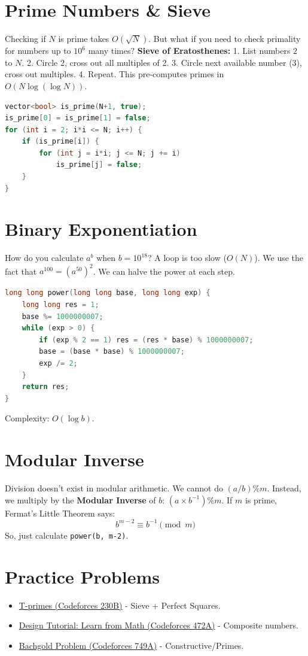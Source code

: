 \documentclass[12pt, a4paper]{report}
\begin{document}
\section{Prime Numbers & Sieve}
Checking if $N$ is prime takes $O(\sqrt{N})$.
But what if you need to check primality for numbers up to $10^6$ many times?
\textbf{Sieve of Eratosthenes:}
1. List numbers $2$ to $N$.
2. Circle 2, cross out all multiples of 2.
3. Circle next available number (3), cross out multiples.
4. Repeat.
This pre-computes primes in $O(N \log (\log N))$.

\begin{lstlisting}[language=C++]
vector<bool> is_prime(N+1, true);
is_prime[0] = is_prime[1] = false;
for (int i = 2; i*i <= N; i++) {
    if (is_prime[i]) {
        for (int j = i*i; j <= N; j += i)
            is_prime[j] = false;
    }
}
\end{lstlisting}

\section{Binary Exponentiation}
How do you calculate $a^b$ when $b = 10^{18}$? A loop is too slow ($O(N)$).
We use the fact that $a^{100} = (a^{50})^2$. We can halve the power at each step.
\begin{lstlisting}[language=C++]
long long power(long long base, long long exp) {
    long long res = 1;
    base %= 1000000007;
    while (exp > 0) {
        if (exp % 2 == 1) res = (res * base) % 1000000007;
        base = (base * base) % 1000000007;
        exp /= 2;
    }
    return res;
}
\end{lstlisting}
Complexity: $O(\log b)$.

\section{Modular Inverse}
Division doesn't exist in modular arithmetic. We cannot do $(a / b) \% m$.
Instead, we multiply by the \textbf{Modular Inverse} of $b$: $(a \times b^{-1}) \% m$.
If $m$ is prime, Fermat's Little Theorem says:
\[ b^{m-2} \equiv b^{-1} \pmod m \]
So, just calculate \texttt{power(b, m-2)}.

\section{Practice Problems}
\begin{itemize}
    \item \href{https://codeforces.com/problemset/problem/230/B}{T-primes (Codeforces 230B)} - Sieve + Perfect Squares.
    \item \href{https://codeforces.com/problemset/problem/472/A}{Design Tutorial: Learn from Math (Codeforces 472A)} - Composite numbers.
    \item \href{https://codeforces.com/problemset/problem/749/A}{Bachgold Problem (Codeforces 749A)} - Constructive/Primes.
\end{itemize}
\end{document}

